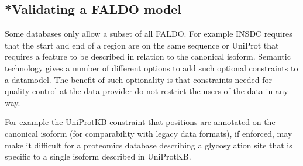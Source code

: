 \subsection{*Validating a FALDO model}

Some databases only allow a subset of all FALDO. For example
INSDC requires that the start and end of a region are on the same sequence 
or UniProt that requires a feature to be described in relation to the canonical isoform.
Semantic technology gives a number of different options\cite{RDFValidationReport} to add 
such optional constraints to a datamodel. 
The benefit of such optionality is that constraints needed for quality control at 
the data provider do not restrict the users of the data in any way. 

For example the UniProtKB constraint that positions are annotated on the canonical isoform 
(for comparability with legacy data formats), if enforced, may make it difficult for a proteomics
database describing a glycosylation site that is specific to a single isoform described in UniProtKB.




